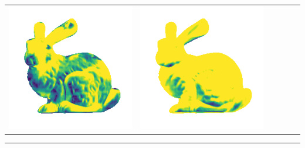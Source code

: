 \begin{center}
\begin{tabularx}{\linewidth}{@{}Y@{}Y@{}Y@{}Y@{}Y@{}Y@{}}
\includegraphics[width=\linewidth]{semisynthetic/20160617_14_marrnet_err.png} &
\includegraphics[width=\linewidth]{semisynthetic/20160617_14_ef_err.png} \\
\end{tabularx}
\begin{center}\rule{0.5\linewidth}{\linethickness}\end{center}


\end{center}
